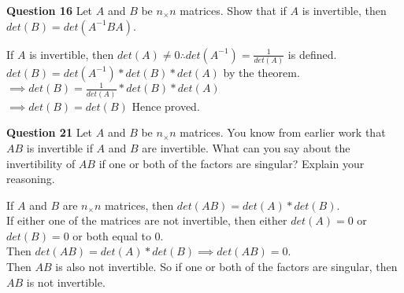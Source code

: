 \documentclass[addpoints]{exam}
\begin{document}
\begin{sloppypar}
\begin{questions}
        \question
        \textbf{Question 16} Let $A$ and $B$ be $ n_{\times}n $ matrices. Show that if $A$ is invertible, then $ det(B) = det(A^{-1}BA) $.
        \begin{solution}
            If $A$ is invertible, then $ det(A) \neq 0 \therefore det(A^{-1}) = \frac{1}{det(A)} $ is defined. \\ 
            $ det(B) = det(A^{-1}) * det(B) * det(A) $ by the theorem. \\ $ \implies det(B) = \frac{1}{det(A)} * det(B) * det(A) $ \\ 
            $ \implies det(B) = det(B) $ Hence proved.   
        \end{solution}

        \question
        \textbf{Question 21} Let $A$ and $B$ be $n_{\times}n$ matrices. You know from earlier work that $AB$ is invertible if $A$ and $B$ are invertible. What can you say about the invertibility of $AB$ if one or both of the factors are singular? Explain your reasoning. 
        \begin{solution}
            If $A$ and $B$ are $n_{\times}n$ matrices, then $ det(AB) = det(A) * det(B) $. \\ 
            If either one of the matrices are not invertible, then either $ det(A) = 0 $ or $ det(B) = 0 $ or both equal to 0. \\ 
            Then $ det(AB) = det(A) * det(B) \implies det(AB) = 0 $. \\ 
            Then $AB$ is also not invertible. So if one or both of the factors are singular, then $AB$ is not invertible.
        \end{solution}

\end{questions}
\end{sloppypar}
\end{document}
